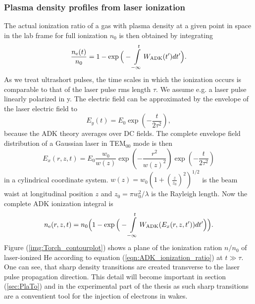 \subsubsection*{Plasma density profiles from laser ionization}
The actual ionization ratio of a gas with plasma density at a given point in space in the lab frame for full ionization $n_0$ is then obtained by integrating 
\begin{equation}
\frac{n_\mathrm{e}(t)}{n_0} =1-\exp\Big(-\int \limits_{-\infty}^t W_\mathrm{ADK}(t')dt'\Big).
\end{equation}
As we treat ultrashort pulses, the time scales in which the ionization occurs is comparable to that of the laser pulse rms length $\tau$. We assume e.g. a laser pulse linearly polarized in y. 
The electric field can be approximated by the envelope of the laser electric field to 
\begin{equation}
E_{y}(t)=E_0\exp(-\frac{t}{2\tau^2}),
\end{equation}
because the ADK theory averages over DC fields.
The complete envelope  field distribution of a Gaussian laser in TEM$_{00}$ mode is then
\begin{equation}
E_{x}(r,z,t)=E_0\frac{w_0}{w(z)}\exp(-\frac{r^2}{w(z)^2})\exp(-\frac{t}{2\tau^2})
\end{equation}
in a cylindrical coordinate system.
$w(z)=w_0(1+(\frac{z}{z_0})^2)^{1/2}$ is the beam waist at longitudinal position $z$ and $z_0=\pi w_0^2/\lambda$ is the Rayleigh length.
Now the complete ADK ionization integral is
\begin{equation}
\label{eqn:ADK_ionization_ratio}
n_\mathrm{e}(r,z,t) = n_0 \Big(1-\exp\Big(-\int \limits_{-\infty}^t W_\mathrm{ADK}(E_{x}(r,z,t'))dt'\Big)\Big).
\end{equation}
Figure (\ref{img:Torch_contourplot}) shows a plane of the ionization ration $n/n_0$ of laser-ionized He according to equation (\ref{eqn:ADK_ionization_ratio}) at $t \gg \tau$. One can see, that sharp density transitions are created transverse to the laser pulse propagation direction. This detail will become important in section (\ref{sec:PlaTo}) and in the experimental part of the thesis as such sharp transitions are a conventient tool for the injection of electrons in wakes.

